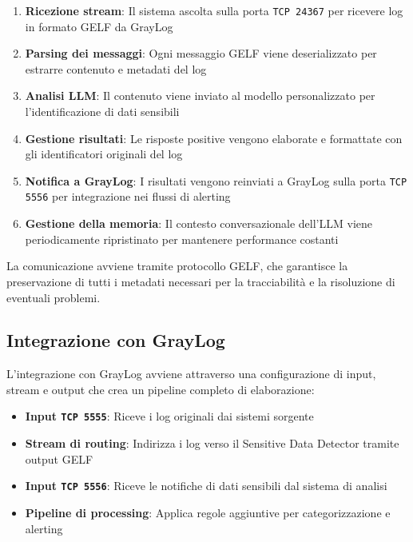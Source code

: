 \documentclass[12pt]{report}
\begin{document}
\begin{enumerate}
    \item \textbf{Ricezione stream}: Il sistema ascolta sulla porta \texttt{TCP 24367} per ricevere log in formato GELF da GrayLog
    \item \textbf{Parsing dei messaggi}: Ogni messaggio GELF viene deserializzato per estrarre contenuto e metadati del log
    \item \textbf{Analisi LLM}: Il contenuto viene inviato al modello personalizzato per l'identificazione di dati sensibili
    \item \textbf{Gestione risultati}: Le risposte positive vengono elaborate e formattate con gli identificatori originali del log
    \item \textbf{Notifica a GrayLog}: I risultati vengono reinviati a GrayLog sulla porta \texttt{TCP 5556} per integrazione nei flussi di alerting
    \item \textbf{Gestione della memoria}: Il contesto conversazionale dell'LLM viene periodicamente ripristinato per mantenere performance costanti
\end{enumerate}

La comunicazione avviene tramite protocollo GELF, che garantisce la preservazione di tutti i metadati necessari per la tracciabilità e la risoluzione di eventuali problemi.


\subsection{Integrazione con GrayLog}
\label{subsec:ver3_integrazione}

L'integrazione con GrayLog avviene attraverso una configurazione di input, stream e output che crea un pipeline completo di elaborazione:

\begin{itemize}
    \item \textbf{Input \texttt{TCP 5555}}: Riceve i log originali dai sistemi sorgente
    \item \textbf{Stream di routing}: Indirizza i log verso il Sensitive Data Detector tramite output GELF
    \item \textbf{Input \texttt{TCP 5556}}: Riceve le notifiche di dati sensibili dal sistema di analisi
    \item \textbf{Pipeline di processing}: Applica regole aggiuntive per categorizzazione e alerting
\end{itemize}
\end{document}
